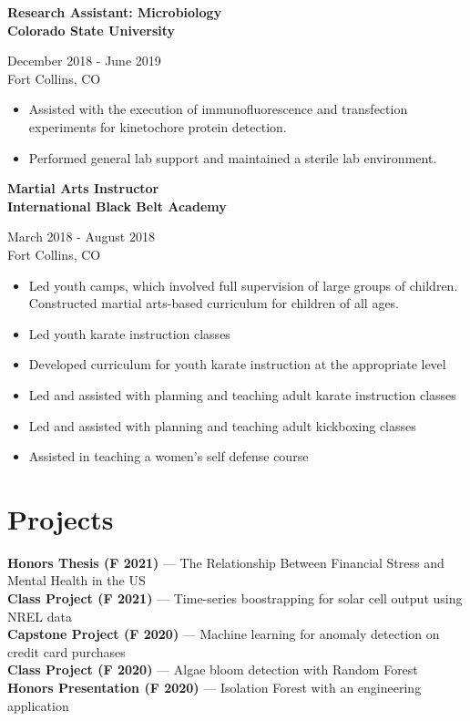 \documentclass{article}
\newcommand{\resumeSubheading}[5]{
\noindent\begin{minipage}{0.5\textwidth}
	\begin{flushleft}
	\textbf{#1}\\
	\textbf{#2}\\
	\end{flushleft}
\end{minipage}%
\hfill
\begin{minipage}{0.5\textwidth}
	\begin{flushright}
	#3\\
	#4\\
	\end{flushright}
\end{minipage}%
\newline
#5
}
\newcommand{\project}[3]{
\textbf{#1 (#2)} --- #3
}
\begin{document}
\resumeSubheading{Research Assistant: Microbiology}{Colorado State University}{December 2018 - June 2019}{Fort Collins, CO}{ %
\begin{itemize} %
	\item Assisted with the execution of immunofluorescence and transfection experiments for kinetochore protein detection. %
	\item Performed general lab support and maintained a sterile lab environment. %
\end{itemize} %
} %

\resumeSubheading{Martial Arts Instructor}{International Black Belt Academy}{March 2018 - August 2018}{Fort Collins, CO}{ %
\begin{itemize} %
	\item Led youth camps, which involved full supervision of large %
		groups of children. Constructed martial arts-based curriculum for children of %
		all ages. %
	\item Led youth karate instruction classes %
	\item Developed curriculum for youth karate instruction at the appropriate level %
	\item Led and assisted with planning and teaching adult karate instruction classes %
	\item Led and assisted with planning and teaching adult kickboxing classes %
	\item Assisted in teaching a women's self defense course %
\end{itemize} %
} %



\section{Projects} %
\project{Honors Thesis}{F 2021}{The Relationship Between Financial Stress and Mental Health in the US}\\ %
\project{Class Project}{F 2021}{Time-series boostrapping for solar cell output using NREL data}\\ %
\project{Capstone Project}{F 2020}{Machine learning for anomaly detection on credit card purchases}\\ %
\project{Class Project}{F 2020}{Algae bloom detection with Random Forest}\\ %
\project{Honors Presentation}{F 2020}{Isolation Forest with an engineering application}\\ %
\end{document}
